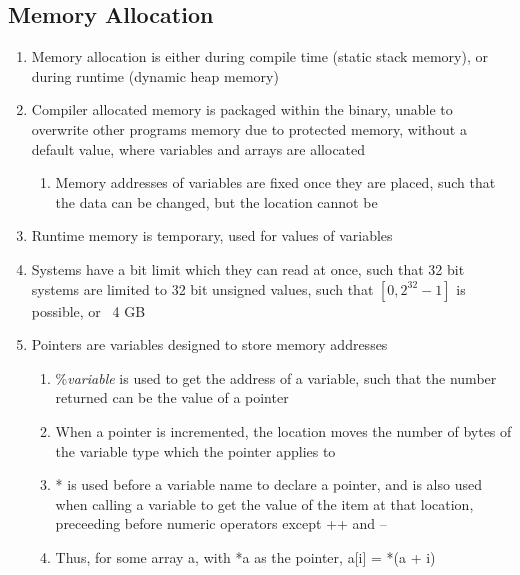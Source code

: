 \documentclass[11 pt, twoside]{article}
\begin{document}
\subsection{Memory Allocation}
\begin{enumerate}
\item Memory allocation is either during compile time (static stack memory), or during runtime (dynamic heap memory)
\item Compiler allocated memory is packaged within the binary, unable to overwrite other programs memory due to protected memory, without a default value, where variables and arrays are allocated
\begin{enumerate}
\item Memory addresses of variables are fixed once they are placed, such that the data can be changed, but the location cannot be
\end{enumerate}
\item Runtime memory is temporary, used for values of variables
\item Systems have a bit limit which they can read at once, such that 32 bit systems are limited to 32 bit unsigned values, such that $[0, 2^32-1]$ is possible, or ~4 GB 
\item Pointers are variables designed to store memory addresses
\begin{enumerate}
\item \%\textit{variable} is used to get the address of a variable, such that the number returned can be the value of a pointer 
\item When a pointer is incremented, the location moves the number of bytes of the variable type which the pointer applies to
\item * is used before a variable name to declare a pointer, and is also used when calling a variable to get the value of the item at that location, preceeding before numeric operators except ++ and --
\item Thus, for some array a, with *a as the pointer, a[i] = *(a + i)
\end{enumerate}
\end{enumerate}
\end{document}
